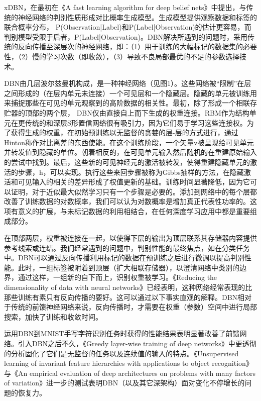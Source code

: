 xDBN，在最初在《A fast learning algorithm for deep belief nets》中提出，与传统的神经网络的判别性质形成对比概率生成模型。生成模型提供观察数据和标签的联合概率分布， P(Observation|Label)和P(Label|Observation)的估计更容易，而判别模型受限于后者，P(Label|Observation)。DBN解决所遇到的问题时，采用传统的反向传播至深层次的神经网络，即：（1）用于训练的大幅标记的数据集的必要性，（2）慢的学习次数（即收敛），（3）导致不良局部最优的不足的参数选择技术。

DBN由几层波尔兹曼机构成，是一种神经网络（见图1）。这些网络被“限制”在层之间形成的（在层内单元未连接）一个可见层和一个隐藏层。隐藏的单元被训练用来捕捉那些在可见的单元观察到的高阶数据的相关性。最初，除了形成一个相联存贮器的顶部的两个层， DBN仅由直接自上而下生成的权重连接。RBM作为结构单元在更传统的和深层S形置信网络很有吸引力，因为它们易于学习这些连接权。为了获得生成的权重，在初始预训练以无监督的贪婪的层-层的方式进行，通过Hinton称作对比离差的东西使能。在这个训练阶段，一个矢量v被呈现给可见单元并转发值到隐藏的单位。朝着相反的，在可见单元输入然后随机的在重建原始输入的尝试中找到。最后，这些新的可见神经元的激活被转发，使得重建隐藏单元的激活的步骤，h，可以实现。执行这些来回步骤被称为Gibbs抽样的方法，在隐藏激活和可见输入的相关的差异形成了权值更新的基础。训练时间显著降低，因为它可以证明，对于近似最大似然学习只有一个步骤是必要的。添加到网络中的每个层都改善了训练数据的对数概率，我们可以认为对数概率是增加真正代表性功率的。这项有意义的扩展，与未标记数据的利用相结合，在任何深度学习应用中都是重要组成部分。

在顶部两层，权重被连接在一起，以使得下层的输出为顶层联系其存储器内容提供参考线索或连结。我们经常遇到的问题中，判别性能的最终焦点，如在分类任务中。DBN可以通过反向传播利用标记的数据在预训练之后进行微调以提高判别性能。此时，一组标签被附着到顶层（扩大相联存储器），以澄清网络中类别的边界，通过这样，一组新的自下而上，识别权重被学习。《Reducing the dimensionality of data with neural networks》已经表明，这种网络经常表现的比那些训练有素只有反向传播的要好。这可以通过以下事实直观的解释。DBN相对于传统的前馈神经网络来说，反向传播时，才需要在权重（参数）空间中进行局部搜索，加快了训练和收敛时间。

运用DBN到MNIST手写字符识别任务时获得的性能结果表明显著改善了前馈网络。引入DBN之后不久，《Greedy layer-wise training of deep networks》中更透彻的分析固化了它们是无监督的任务以及连续值的输入的特点。《Unsupervised learning of invariant feature hierarchies with applications to object recognition》与《An empirical evaluation of deep architectures on problems with many factors of variation》进一步的测试表明DBN（以及其它深架构）面对变化不停增长的问题的恢复力。

